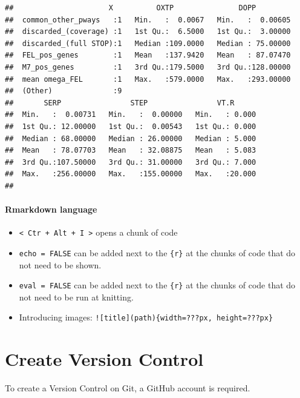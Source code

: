 \documentclass[
]{article}
\providecommand{\tightlist}{%
  \setlength{\itemsep}{0pt}\setlength{\parskip}{0pt}}
\begin{document}
\begin{verbatim}
##                      X          OXTP               DOPP          
##  common_other_pways   :1   Min.   :  0.0067   Min.   :  0.00605  
##  discarded_(coverage) :1   1st Qu.:  6.5000   1st Qu.:  3.00000  
##  discarded_(full STOP):1   Median :109.0000   Median : 75.00000  
##  FEL_pos_genes        :1   Mean   :137.9420   Mean   : 87.07470  
##  M7_pos_genes         :1   3rd Qu.:179.5000   3rd Qu.:128.00000  
##  mean omega_FEL       :1   Max.   :579.0000   Max.   :293.00000  
##  (Other)              :9                                         
##       SERP                STEP                VT.R       
##  Min.   :  0.00731   Min.   :  0.00000   Min.   : 0.000  
##  1st Qu.: 12.00000   1st Qu.:  0.00543   1st Qu.: 0.000  
##  Median : 68.00000   Median : 26.00000   Median : 5.000  
##  Mean   : 78.07703   Mean   : 32.08875   Mean   : 5.083  
##  3rd Qu.:107.50000   3rd Qu.: 31.00000   3rd Qu.: 7.000  
##  Max.   :256.00000   Max.   :155.00000   Max.   :20.000  
## 
\end{verbatim}

\hypertarget{rmarkdown-language}{%
\paragraph{Rmarkdown language}\label{rmarkdown-language}}

\begin{itemize}
\tightlist
\item
  \texttt{\textless{}\ Ctr\ +\ Alt\ +\ I\ \textgreater{}} opens a chunk
  of code
\item
  \texttt{echo\ =\ FALSE} can be added next to the \texttt{\{r\}} at the
  chunks of code that do not need to be shown.
\item
  \texttt{eval\ =\ FALSE} can be added next to the \texttt{\{r\}} at the
  chunks of code that do not need to be run at knitting.
\item
  Introducing images:
  \texttt{!{[}title{]}(path)\{width=???px,\ height=???px\}}
\end{itemize}

\hypertarget{create-version-control}{%
\section{Create Version Control}\label{create-version-control}}

To create a Version Control on Git, a GitHub account is required.
\end{document}
